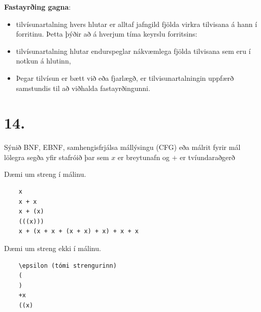 \documentclass{article}
\newcommand{\bo}[1]{\textbf{#1}}
\begin{document}
 \bo{Fastayrðing gagna}: 
 \begin{itemize}
    \item tilvísunartalning hvers hlutar er alltaf jafngild fjölda virkra tilvisana á hann í forritinu.
            Þetta þýðir að á hverjum tíma keyrslu forritsins:
            \item tilvísunartalning hlutar endurspeglar nákvæmlega fjölda tilvisana sem eru í notkun á hlutinn,
            \item Þegar tilvísun er bætt við eða fjarlægð, er tilvisunartalningin uppfærð samstundis til að
                  viðhalda fastayrðingunni.
 \end{itemize}

 

 \newpage
 \section{14.}
 Sýnið BNF, EBNF, samhengisfrjálsa mállýsingu (CFG) eða málrit
 fyrir mál lölegra segða yfir stafróið  þar sem $x$ er
 breytunafn og $+$ er tvíundaraðgerð

 Dæmi um streng í málinu.
 \begin{verbatim}
    x
    x + x
    x + (x)
    (((x)))
    x + (x + x + (x + x) + x) + x + x
 \end{verbatim}
 
 Dæmi um streng ekki í málinu.

\begin{verbatim}
    \epsilon (tómi strengurinn)
    (
    )
    +x
    ((x)
 \end{verbatim}

 \begin{verbatim}
    
 \end{verbatim}
\end{document}
